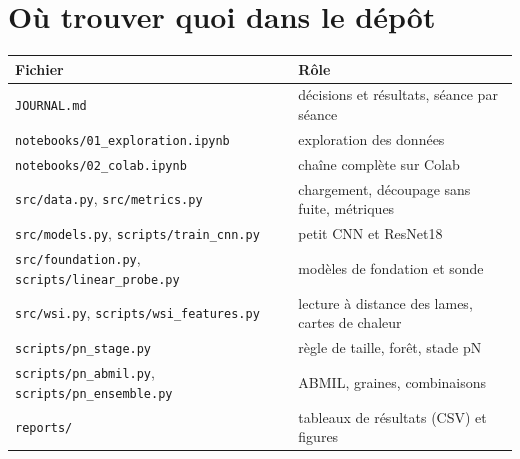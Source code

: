 \documentclass[11pt,a4paper]{article}
\begin{document}
\section{Où trouver quoi dans le dépôt}
\begin{table}[H]
\centering
\small
\begin{tabularx}{\textwidth}{lX}
\toprule
\textbf{Fichier} & \textbf{Rôle} \\
\midrule
\texttt{JOURNAL.md} & décisions et résultats, séance par séance \\
\texttt{notebooks/01\_exploration.ipynb} & exploration des données \\
\texttt{notebooks/02\_colab.ipynb} & chaîne complète sur Colab \\
\texttt{src/data.py}, \texttt{src/metrics.py} & chargement, découpage sans fuite, métriques \\
\texttt{src/models.py}, \texttt{scripts/train\_cnn.py} & petit CNN et ResNet18 \\
\texttt{src/foundation.py}, \texttt{scripts/linear\_probe.py} & modèles de fondation et sonde \\
\texttt{src/wsi.py}, \texttt{scripts/wsi\_features.py} & lecture à distance des lames, cartes de chaleur \\
\texttt{scripts/pn\_stage.py} & règle de taille, forêt, stade pN \\
\texttt{scripts/pn\_abmil.py}, \texttt{scripts/pn\_ensemble.py} & ABMIL, graines, combinaisons \\
\texttt{reports/} & tableaux de résultats (CSV) et figures \\
\bottomrule
\end{tabularx}
\end{table}
\end{document}
